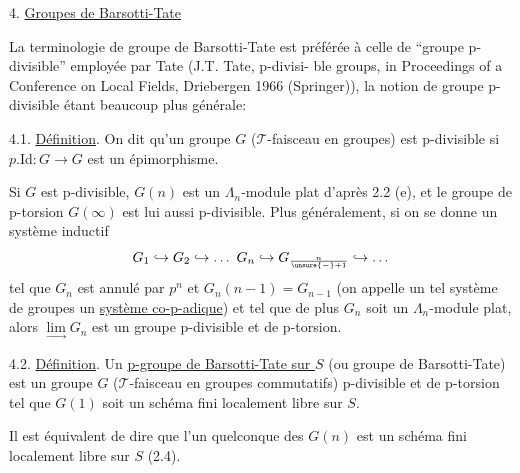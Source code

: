 
4. \uline{Groupes de Barsotti-Tate}

La terminologie de groupe de Barsotti-Tate est préférée à
celle de ``groupe p-divisible'' employée par Tate (J.T. Tate, p-divisi-%
ble groups, in Proceedings of a Conference on Local Fields, Driebergen
1966 (Springer)), la notion de groupe p-divisible étant beaucoup plus
générale:

4.1. \uline{Définition}. On dit qu'un groupe $G$ ($\mathcal{T}$-faisceau en groupes)
est p-divisible si $p.\mathrm{Id}\colon G \to G$ est un épimorphisme.

Si $G$ est p-divisible, $G(n)$ est un $\Lambda_n$-module plat d'après
2.2 (e), et le groupe de p-torsion $G(\infty)$ est lui aussi p-divisible.
Plus généralement, si on se donne un système inductif
 
\[ G_1 \hookrightarrow G_2 \hookrightarrow \ldots\ G_n \hookrightarrow G_{n\over{\unsure{-}}{+}1} \hookrightarrow \ldots \]
tel que $G_n$ est annulé par $p^n$ et $G_n(n-1) = G_{n-1}$ (on appelle un tel
système de groupes un \uline{système co-p-adique}) et tel que de plus $G_n$ soit
un $\Lambda_n$-module plat, alors $\lim\limits_{\rightarrow} G_n$ est un groupe p-divisible et de p-torsion.

4.2. \uline{Définition}. Un \uline{p-groupe de Barsotti-Tate sur $S$} (ou groupe
de Barsotti-Tate) est un groupe $G$ ($\mathcal{T}$-faisceau en groupes commutatifs)
p-divisible et de p-torsion tel que $G(1)$ soit un schéma fini localement
libre sur $S$.

Il est équivalent de dire que l'un quelconque des $G(n)$ est
un schéma fini localement libre sur $S$ (2.4).

